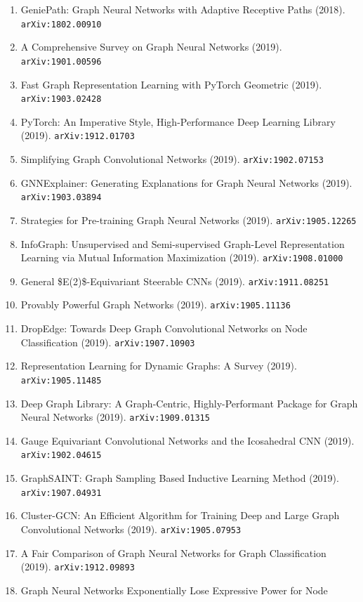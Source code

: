 \documentclass[11pt]{article}
\begin{document}
\begin{enumerate}
  \item GeniePath: Graph Neural Networks with Adaptive Receptive Paths (2018). \texttt{arXiv:1802.00910}
  \item A Comprehensive Survey on Graph Neural Networks (2019). \texttt{arXiv:1901.00596}
  \item Fast Graph Representation Learning with PyTorch Geometric (2019). \texttt{arXiv:1903.02428}
  \item PyTorch: An Imperative Style, High-Performance Deep Learning Library (2019). \texttt{arXiv:1912.01703}
  \item Simplifying Graph Convolutional Networks (2019). \texttt{arXiv:1902.07153}
  \item GNNExplainer: Generating Explanations for Graph Neural Networks (2019). \texttt{arXiv:1903.03894}
  \item Strategies for Pre-training Graph Neural Networks (2019). \texttt{arXiv:1905.12265}
  \item InfoGraph: Unsupervised and Semi-supervised Graph-Level Representation
  Learning via Mutual Information Maximization (2019). \texttt{arXiv:1908.01000}
  \item General \$E(2)\$-Equivariant Steerable CNNs (2019). \texttt{arXiv:1911.08251}
  \item Provably Powerful Graph Networks (2019). \texttt{arXiv:1905.11136}
  \item DropEdge: Towards Deep Graph Convolutional Networks on Node
  Classification (2019). \texttt{arXiv:1907.10903}
  \item Representation Learning for Dynamic Graphs: A Survey (2019). \texttt{arXiv:1905.11485}
  \item Deep Graph Library: A Graph-Centric, Highly-Performant Package for Graph
  Neural Networks (2019). \texttt{arXiv:1909.01315}
  \item Gauge Equivariant Convolutional Networks and the Icosahedral CNN (2019). \texttt{arXiv:1902.04615}
  \item GraphSAINT: Graph Sampling Based Inductive Learning Method (2019). \texttt{arXiv:1907.04931}
  \item Cluster-GCN: An Efficient Algorithm for Training Deep and Large Graph
  Convolutional Networks (2019). \texttt{arXiv:1905.07953}
  \item A Fair Comparison of Graph Neural Networks for Graph Classification (2019). \texttt{arXiv:1912.09893}
  \item Graph Neural Networks Exponentially Lose Expressive Power for Node

\end{enumerate}
\end{document}
